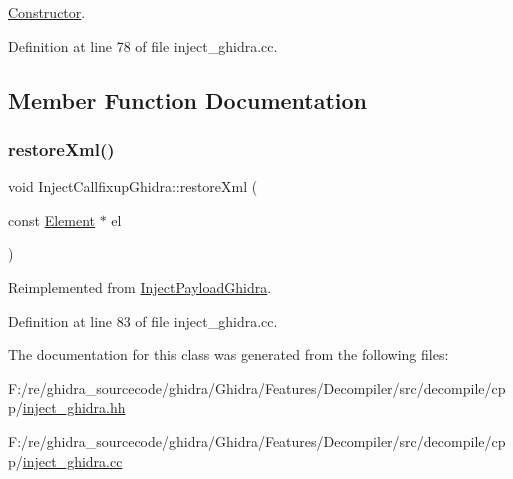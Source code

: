 \mbox{\hyperlink{class_constructor}{Constructor}}. 



Definition at line 78 of file inject\+\_\+ghidra.\+cc.



\subsection{Member Function Documentation}
\mbox{\label{class_inject_callfixup_ghidra_aa37f8393c5bd7ca6ef68220b278acd19}} 
\subsubsection{\texorpdfstring{restoreXml()}{restoreXml()}}
{\footnotesize\ttfamily void Inject\+Callfixup\+Ghidra\+::restore\+Xml (\begin{DoxyParamCaption}\item[{const \mbox{\hyperlink{class_element}{Element}} $\ast$}]{el }\end{DoxyParamCaption})\hspace{0.3cm}{\ttfamily [virtual]}}



Reimplemented from \mbox{\hyperlink{class_inject_payload_ghidra_a5ccd974310decec0bdb6985f89c0f0ed}{Inject\+Payload\+Ghidra}}.



Definition at line 83 of file inject\+\_\+ghidra.\+cc.



The documentation for this class was generated from the following files\+:\begin{DoxyCompactItemize}
\item 
F\+:/re/ghidra\+\_\+sourcecode/ghidra/\+Ghidra/\+Features/\+Decompiler/src/decompile/cpp/\mbox{\hyperlink{inject__ghidra_8hh}{inject\+\_\+ghidra.\+hh}}\item 
F\+:/re/ghidra\+\_\+sourcecode/ghidra/\+Ghidra/\+Features/\+Decompiler/src/decompile/cpp/\mbox{\hyperlink{inject__ghidra_8cc}{inject\+\_\+ghidra.\+cc}}\end{DoxyCompactItemize}
